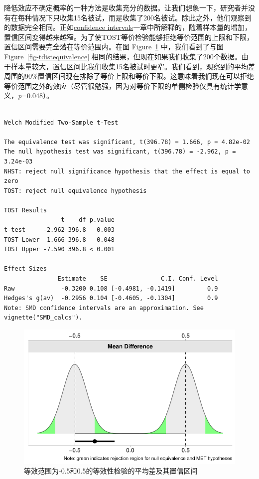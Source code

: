 \documentclass[
  letterpaper,
  DIV=11,
  numbers=noendperiod]{scrreprt}
\begin{document}
降低效应不确定概率的一种方法是收集充分的数据。让我们想象一下，研究者并没有在每种情况下只收集15名被试，而是收集了200名被试。除此之外，他们观察到的数据完全相同。正如\protect\hyperlink{confint}{confidence
intervals}一章中所解释的，随着样本量的增加，置信区间变得越来越窄。为了使TOST等价检验能够拒绝等价范围的上限和下限，置信区间需要完全落在等价范围内。在图
Figure~\ref{fig-ciequivalence1} 中，我们看到了与图
Figure~\ref{fig-tdistequivalence}
相同的结果，但现在如果我们收集了200个数据。由于样本量较大，置信区间比我们收集15名被试时更窄。我们看到，观察到的平均差周围的90\%置信区间现在排除了等价上限和等价下限。这意味着我们现在可以拒绝等价范围之外的效应（尽管很勉强，因为对等价下限的单侧检验仅具有统计学意义，\emph{p}=0.048）。

\begin{verbatim}

Welch Modified Two-Sample t-Test

The equivalence test was significant, t(396.78) = 1.666, p = 4.82e-02
The null hypothesis test was significant, t(396.78) = -2.962, p = 3.24e-03
NHST: reject null significance hypothesis that the effect is equal to zero 
TOST: reject null equivalence hypothesis

TOST Results 
                t    df p.value
t-test     -2.962 396.8   0.003
TOST Lower  1.666 396.8   0.048
TOST Upper -7.590 396.8 < 0.001

Effect Sizes 
               Estimate    SE               C.I. Conf. Level
Raw             -0.3200 0.108 [-0.4981, -0.1419]         0.9
Hedges's g(av)  -0.2956 0.104 [-0.4605, -0.1304]         0.9
Note: SMD confidence intervals are an approximation. See vignette("SMD_calcs").
\end{verbatim}

\begin{figure}

{\centering \includegraphics[width=1\textwidth,height=\textheight]{09-equivalencetest_files/figure-pdf/fig-ciequivalence1-1.pdf}

}

\caption{\label{fig-ciequivalence1}等效范围为-0.5和0.5的等效性检验的平均差及其置信区间}

\end{figure}
\end{document}

